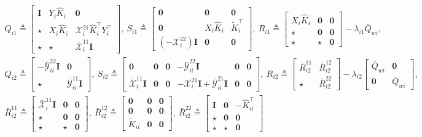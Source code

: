 \documentclass[letterpaper, 10 pt, conference]{ieeeconf}%
\newcommand{\T}{\top}
\newcommand{\I}{\mathbf{I}}
\newcommand{\0}{\mathbf{0}}
\newcommand{\X}{\mathcal{X}}
\newcommand{\Y}{\mathcal{Y}}
\newcommand{\x}{{\scriptstyle \X}}
\newcommand{\y}{{\scriptstyle \Y}}
\newcommand{\bm}[1]{\begin{bmatrix}#1\end{bmatrix}}
\begin{document}
\begin{figure}
\begin{equation}\label{Eq:Pr:DataDrivenLocalControllerDesignRevisitDefinitions}
\begin{gathered}
Q_{i1} \triangleq \bm{ 
\I & Y_i \hat{K}_i & \0 \\
\star & X_i \hat{K}_i  & \x^{21}_i \hat{K}_i^\T Y_i^\T\\
\star & \star & \bar{\x}^{11}_i\I 
},\
S_{i1} \triangleq \bm{\0 & \0 & \0 \\ \0 & X_i \hat{K}_i & \tilde{K}_i^\T \\ (-\x_i^{22})\I & \0 & \0},\ 
R_{i1} \triangleq \bm{X_i \hat{K}_i & \0 & \0 \\ \star & \0 & \0 \\ \star & \star & \0 } - \lambda_{i1} \bar{Q}_{wi},\\ 
Q_{i2} \triangleq 
\bm{
-\bar{\y}^{22}_{ii}\I & \0 \\ 
\star & \bar{\y}^{11}_{ii}\I 
},\ 
S_{i2} \triangleq 
\bm{
\0 & \0 & \0 & -\bar{\y}^{22}_{ii}\I & \0 & \0\\
\bar{\x}_i^{11}\I & \0 & \0 & -\x_i^{21}\I + \bar{\y}^{21}_{ii}\I & \0 & \0},\ 
R_{i2} \triangleq  
\bm{\bar{R}_{i2}^{11} & \bar{R}_{i2}^{12} \\ \star & \bar{R}_{i2}^{22}} 
- \lambda_{i2}\bm{\bar{Q}_{wi} & \0 \\ \0 & \bar{Q}_{wi}},\\
\bar{R}_{i2}^{11} \triangleq \bm{ \bar{\x}_i^{11}\I & \0 & \0 \\ \star & \0 & \0 \\ \star & \star & \0},\     
\bar{R}_{i2}^{12} \triangleq \bm{ \0 & \0 & \0 \\ \0 & \0 & \0 \\ \tilde{K}_{ii} & \0 & \0},\  
\bar{R}_{i2}^{22} \triangleq \bm{ \I & \0 & -\hat{K}_{ii}^\T \\ \star & \0 & \0 \\ \star & \star & \0} 
\end{gathered}
\end{equation}
\hrulefill
\end{figure}
\end{document}
